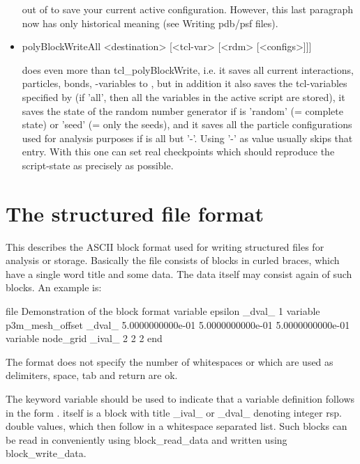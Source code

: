 \begin{itemize}
out of \es to save your current active configuration.  However, this
last paragraph now has only historical meaning (see Writing pdb/psf
files).
 \item
\begin{code}
polyBlockWriteAll <destination> [<tcl-var> [<rdm> [<configs>]]]
\end{code}

does even more than tcl\_polyBlockWrite, i.e. it saves all current
interactions, particles, bonds, \es{}-variables to ,
but in addition it also saves the tcl-variables specified by
 (if 'all', then all the variables in the active script
are stored), it saves the state of the random number generator if
 is 'random' (= complete state) or 'seed' (= only the seeds),
and it saves all the particle configurations used for analysis
purposes if  is all but '-'.  Using '-' as value usually
skips that entry.  With this one can set real checkpoints which should
reproduce the script-state as precisely as possible.
\end{itemize}

\section{The structured file format}
\label{sec:structured-file-format}

This describes the ASCII block format used for writing structured
files for analysis or storage. Basically the file consists of blocks
in curled braces, which have a single word title and some data. The
data itself may consist again of such blocks. An example is:
\begin{tclcode}
{file {Demonstration of the block format}
{variable epsilon {_dval_ 1} } 
{variable p3m_mesh_offset {_dval_ 5.0000000000e-01
 5.0000000000e-01 5.0000000000e-01 } } 
{variable node_grid {_ival_ 2 2 2 } } 
{end } }
\end{tclcode}

The format does not specify the number of whitespaces or which are
used as delimiters, space, tab and return are ok.

The keyword variable should be used to indicate that a variable
definition follows in the form  . 
itself is a block with title \_ival\_ or \_dval\_ denoting integer
rsp. double values, which then follow in a whitespace separated list.
Such blocks can be read in conveniently using block\_read\_data and
written using block\_write\_data.

